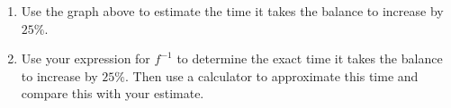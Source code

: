 \documentclass{ximera}
\begin{document}
\begin{question}
\begin{enumerate}
\begin{enumerate}
\item Use algebra and solve the equation $B=f(t)$ for $t$ to find an expression for the function $t = f^{-1})(B)$. Check that you get the same result.

\item State the domain and range of $f^{-1}$ using set-buider notation. Describe also the meaning of this function. What does it take as an input? What does it return as an output.

\item Use the graph of $B=f(t)$ above to sketch \emph{by hand} a graph of $t=f^{-1}(B)$.

\end{enumerate}

\item Use the graph above to estimate the time it takes the balance to increase by $25\%$.

\item Use your expression for $f^{-1}$ to determine the exact time it takes the balance to increase by $25\%$. Then use a calculator to approximate this time and compare this with your estimate.

\end{enumerate}
\end{question}
\end{document}
